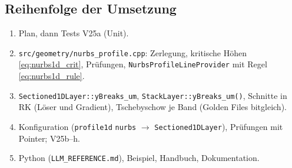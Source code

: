 \subsection{Reihenfolge der Umsetzung}
\begin{enumerate}[nosep]
  \item Plan, dann Tests V25a (Unit).
  \item \verb|src/geometry/nurbs_profile.cpp|: Zerlegung, kritische Höhen \eqref{eq:nurbs1d_crit}, Prüfungen,
        \verb|NurbsProfileLineProvider| mit Regel \eqref{eq:nurbs1d_rule}.
  \item \verb|Sectioned1DLayer::yBreaks_um|, \verb|StackLayer::yBreaks_um()|, Schnitte in RK (Löser und Gradient),
        Tschebyschow je Band (Golden Files bitgleich).
  \item Konfiguration (\verb|profile1d| \verb|nurbs| $\to$ \verb|Sectioned1DLayer|), Prüfungen mit Pointer; V25b--h.
  \item Python (\verb|LLM_REFERENCE.md|), Beispiel, Handbuch, Dokumentation.
\end{enumerate}
